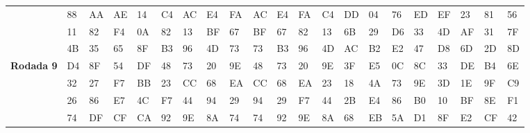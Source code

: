 \documentclass[
    article,            %
    11pt,               %
    oneside,            %
    a4paper,            %
    english,            %
    brazil,             %
    sumario=tradicional,
    ]{abntex2}
\begin{document}
\begin{table}[H]
{\begin{tabular}{|
>{\columncolor[HTML]{C0C0C0}}l |llll|llll|llll|llll|llll|}
                                                     & 88            & AA            & AE            & 14            & C4            & AC           & E4           & FA           & AC            & E4            & FA           & C4           & DD            & 04             & 76            & ED           & EF            & 23            & 81            & 56           \\
                                                     & 11            & 82            & F4            & 0A            & 82            & 13           & BF           & 67           & BF            & 67            & 82           & 13           & 6B            & 29            & D6            & 33           & 4D            & AF            & 31            & 7F           \\
                                                     & 4B            & 35            & 65            & 8F            & B3            & 96           & 4D           & 73           & 73            & B3            & 96           & 4D           & AC            & B2            & E2            & 47           & D8            & 6D            & 2D            & 8D           \\ \hline
\textbf{Rodada 9}                                                    & D4            & 8F            & 54            & DF            & 48            & 73           & 20           & 9E           & 48            & 73            & 20           & 9E           & 3F            & E5            & 0C            & 8C           & 33            & DE            & B4            & 6E           \\
                                                     & 32            & 27            & F7            & BB            & 23            & CC           & 68           & EA           & CC            & 68            & EA           & 23           & 18            & 4A            & 73            & 9E           & 3D            & 1E            & 9F            & C9           \\
                                                     & 26            & 86            & E7            & 4C            & F7            & 44           & 94           & 29           & 94            & 29            & F7           & 44           & 2B            & E4            & 86            & B0           & 10            & BF            & 8E            & F1           \\
                                                     & 74            & DF            & CF            & CA            & 92            & 9E           & 8A           & 74           & 74            & 92            & 9E           & 8A           & 68            & EB            & 5A            & D1           & 8F            & E2            & CF            & 42           \\ \hline

\end{tabular}}
\end{table}
\end{document}
